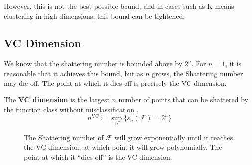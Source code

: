   However, this is not the best possible bound, and in cases such as K means clustering in high dimensions, this bound can be tightened. 

\subsection{VC Dimension}

  We know that the \hyperref[def:shattering-number]{shattering number} is bounded above by $2^n$. For $n = 1$, it is reasonable that it achieves this bound, but as $n$ grows, the Shattering number may die off. The point at which it dies off is precisely the VC dimension.  

  \begin{definition}[VC Dimension]
    \label{def:vc-dimension}
    The \textbf{VC dimension} is the largest $n$ number of points that can be shattered by the function class without misclassification \cite{1971vapnik}. 
    \begin{equation}
      n^{\mathrm{VC}} \coloneqq \sup_n \{ s_n (\mathcal{F}) = 2^n \}
    \end{equation}

    \begin{figure}[H]
      \centering 
      \caption{The Shattering number of $\mathcal{F}$ will grow exponentially until it reaches the VC dimension, at which point it will grow polynomially. The point at which it ``dies off'' is the VC dimension.} 
      \label{fig:sawyer_lemma}
    \end{figure}
  \end{definition}

